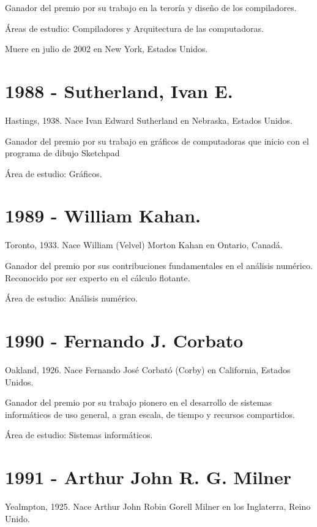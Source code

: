 \documentclass[notitlepage,letterpaper, 11pt]{article}
\begin{document}
\noindent Ganador del premio por su trabajo en la teroría y diseño de los compiladores.

\noindent Áreas de estudio: Compiladores y Arquitectura de las computadoras.

\noindent Muere en julio de 2002 en New York, Estados Unidos.
\newline

\section*{1988 - Sutherland, Ivan E.}
\noindent Hastings, 1938. Nace Ivan Edward Sutherland en Nebraska, Estados Unidos.

\noindent Ganador del premio por su trabajo en gráficos de computadoras que inicio con el programa de dibujo Sketchpad

\noindent Área de estudio: Gráficos.
\newline

\section*{1989 - William Kahan.}
\noindent Toronto, 1933. Nace William (Velvel) Morton Kahan en Ontario, Canadá.

\noindent Ganador del premio por sus contribuciones fundamentales en el análisis numérico. Reconocido por ser experto en el cálculo flotante.

\noindent Área de estudio: Análisis numérico.
\newline

\section*{1990 - Fernando J. Corbato}
\noindent Oakland, 1926. Nace Fernando José Corbató (Corby) en California, Estados Unidos.

\noindent Ganador del premio por su trabajo pionero en el desarrollo de sistemas informáticos de uso general, a gran escala, de tiempo y recursos compartidos. 

\noindent Área de estudio: Sistemas informáticos.
\newpage

\section*{1991 - Arthur John R. G. Milner}
\noindent Yealmpton, 1925. Nace Arthur John Robin Gorell Milner en los Inglaterra, Reino Unido.
\end{document}

